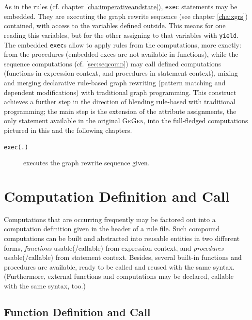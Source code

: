 As in the rules (cf. chapter \ref{cha:imperativeandstate}), \texttt{exec} statements may be embedded.
They are executing the graph rewrite sequence (see chapter \ref{cha:xgrs}) contained, with access to the variables defined outside.
This means for one reading this variables, but for the other assigning to that variables with \texttt{yield}.
The embedded \texttt{exec}s allow to apply rules from the computations, more exactly: from the procedures (embedded execs are not available in functions), while the sequence computations (cf. \ref{sec:seqcomp}) may call defined computations (functions in expression context, and procedures in statement context), mixing and merging declarative rule-based graph rewriting (pattern matching and dependent modifications) with traditional graph programming.
This construct achieves a further step in the direction of blending rule-based with traditional programming; the main step is the extension of the attribute assignments, the only statement available in the original {\scshape GrGen}, into the full-fledged computations pictured in this and the following chapters.

\begin{description}
\item[\texttt{exec(.)}] executes the graph rewrite sequence given. 
\end{description}



\section{Computation Definition and Call} \label{sub:compdef}

Computations that are occurring frequently may be factored out into a computation definition given in the header of a rule file.
Such compound computations can be built and abstracted into reusable entities in two different forms, \emph{functions} usable(/callable) from expression context, and \emph{procedures} usable(/callable) from statement context.
Besides, several built-in functions and procedures are available, ready to be called and reused with the same syntax.
(Furthermore, external functions and computations may be declared, callable with the same syntax, too.)

\subsection{Function Definition and Call}\label{sub:functions}\label{sec:funccall} 


